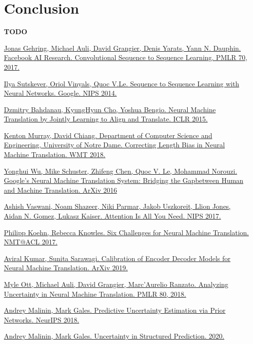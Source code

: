 \documentclass[a4paper,14pt]{extarticle}
\begin{document}
\section{Conclusion}
	\textbf{TODO}
	
	
	\begin{thebibliography}{0}		
		\hypertarget{fconv}{}
		\href{https://arxiv.org/pdf/1705.03122.pdf}
		{Jonas Gehring, Michael Auli, David Grangier, Denis Yarats, Yann N. Dauphin. Facebook AI Research. Convolutional Sequence to Sequence Learning. PMLR 70, 2017.}
		
		\hypertarget{seq2seq}{}
		\href{https://papers.nips.cc/paper/5346-sequence-to-sequence-learning-with-neural-networks.pdf}
		{Ilya Sutskever, Oriol Vinyals, Quoc V.Le. Sequence to Sequence Learning with Neural Networks. Google. NIPS 2014.}
		
		\hypertarget{encdec_att}{}
		\href{https://arxiv.org/pdf/1409.0473.pdf}
		{Dzmitry Bahdanau, KyungHyun Cho, Yoshua Bengio. Neural Machine Translation by Jointly Learning to Align and Translate. ICLR 2015.}
		
		\hypertarget{corr_len_bias}{}
		\href{https://arxiv.org/pdf/1808.10006.pdf}
		{Kenton Murray, David Chiang. Department of Computer Science and Engineering, University of Notre Dame. Correcting Length Bias in Neural Machine Translation. WMT 2018.}
		
		\hypertarget{gnmt}{}
		\href{https://arxiv.org/pdf/1609.08144.pdf}
		{Yonghui Wu, Mike Schuster, Zhifeng Chen, Quoc V. Le, Mohammad Norouzi. Google’s Neural Machine Translation System: Bridging the Gapbetween Human and Machine Translation. ArXiv 2016}
		
		\hypertarget{transformer}{}
		\href{https://arxiv.org/pdf/1706.03762.pdf}
		{Ashish Vaswani, Noam Shazeer, Niki Parmar, Jakob Uszkoreit, Llion Jones, Aidan N. Gomez, Lukasz Kaiser. Attention Is All You Need. NIPS 2017.}
		
		\hypertarget{six_chall}{}
		\href{https://arxiv.org/pdf/1706.03872.pdf}
		{Philipp Koehn, Rebecca Knowles. Six Challenges for Neural Machine Translation. NMT@ACL 2017.}
		
		\hypertarget{calibration}{}
		\href{https://arxiv.org/pdf/1903.00802v1.pdf}
		{Aviral Kumar, Sunita Sarawagi. Calibration of Encoder Decoder Models for Neural Machine Translation. ArXiv 2019.}
		
		\hypertarget{anal_uncertainty}{}
		\href{https://arxiv.org/pdf/1803.00047.pdf}
		{Myle Ott, Michael Auli, David Grangier, Marc'Aurelio Ranzato. Analyzing Uncertainty in Neural Machine Translation. PMLR 80, 2018.}
		
		\hypertarget{prior}{}
		\href{https://papers.nips.cc/paper/7936-predictive-uncertainty-estimation-via-prior-networks.pdf}
		{Andrey Malinin, Mark Gales. Predictive Uncertainty Estimation via Prior Networks. NeurIPS 2018.}
		
		\hypertarget{uncertainty}{}
		\href{https://arxiv.org/pdf/2002.07650.pdf}
		{Andrey Malinin, Mark Gales. Uncertainty in Structured Prediction. 2020.}
	\end{thebibliography}
\end{document}
